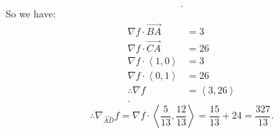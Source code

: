 \begin{itemize}
\begin{example}
\[			 .\] 
			 So we have:
			 \begin{align*}
				 \nabla f \cdot  \vec{BA} &= 3 \\
				 \nabla f \cdot  \vec{CA} &= 26 \\
				 \nabla f \cdot \left<1,0 \right> &= 3 \\
				 \nabla f \cdot \left<0,1 \right> &= 26 \\
				 \therefore \nabla f &= \left<3,26 \right> \\
			 .\end{align*}
			 \[
				 \therefore \nabla_{\hat{AD}}f = \nabla f \cdot \left< \frac{5}{13}, \frac{12}{13} \right> = \frac{15}{13} + 24 = \frac{327}{13}
			 .\] 
		\end{example}
\end{itemize}
